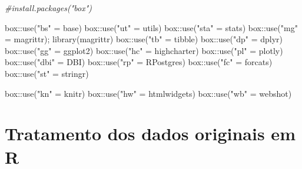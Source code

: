 \documentclass[
]{article}
\newenvironment{Shaded}{\begin{snugshade}}{\end{snugshade}}
\newcommand{\CommentTok}[1]{\textcolor[rgb]{0.56,0.35,0.01}{\textit{#1}}}
\newcommand{\FunctionTok}[1]{\textcolor[rgb]{0.00,0.00,0.00}{#1}}
\newcommand{\NormalTok}[1]{#1}
\newcommand{\OtherTok}[1]{\textcolor[rgb]{0.56,0.35,0.01}{#1}}
\newcommand{\SpecialCharTok}[1]{\textcolor[rgb]{0.00,0.00,0.00}{#1}}
\newcommand{\StringTok}[1]{\textcolor[rgb]{0.31,0.60,0.02}{#1}}
\begin{document}
\begin{Shaded}
\begin{Highlighting}[]
\CommentTok{\#install.packages("box")}

\NormalTok{box}\SpecialCharTok{::}\FunctionTok{use}\NormalTok{(}\StringTok{"bs"} \OtherTok{=}\NormalTok{ base)}
\NormalTok{box}\SpecialCharTok{::}\FunctionTok{use}\NormalTok{(}\StringTok{"ut"} \OtherTok{=}\NormalTok{ utils)}
\NormalTok{box}\SpecialCharTok{::}\FunctionTok{use}\NormalTok{(}\StringTok{"sta"} \OtherTok{=}\NormalTok{ stats)}
\NormalTok{box}\SpecialCharTok{::}\FunctionTok{use}\NormalTok{(}\StringTok{"mg"} \OtherTok{=}\NormalTok{ magrittr); }\FunctionTok{library}\NormalTok{(magrittr)}
\NormalTok{box}\SpecialCharTok{::}\FunctionTok{use}\NormalTok{(}\StringTok{"tb"} \OtherTok{=}\NormalTok{ tibble)}
\NormalTok{box}\SpecialCharTok{::}\FunctionTok{use}\NormalTok{(}\StringTok{"dp"} \OtherTok{=}\NormalTok{ dplyr)}
\NormalTok{box}\SpecialCharTok{::}\FunctionTok{use}\NormalTok{(}\StringTok{"gg"} \OtherTok{=}\NormalTok{ ggplot2)}
\NormalTok{box}\SpecialCharTok{::}\FunctionTok{use}\NormalTok{(}\StringTok{"hc"} \OtherTok{=}\NormalTok{ highcharter)}
\NormalTok{box}\SpecialCharTok{::}\FunctionTok{use}\NormalTok{(}\StringTok{"pl"} \OtherTok{=}\NormalTok{ plotly)}
\NormalTok{box}\SpecialCharTok{::}\FunctionTok{use}\NormalTok{(}\StringTok{"dbi"} \OtherTok{=}\NormalTok{ DBI)}
\NormalTok{box}\SpecialCharTok{::}\FunctionTok{use}\NormalTok{(}\StringTok{"rp"} \OtherTok{=}\NormalTok{ RPostgres)}
\NormalTok{box}\SpecialCharTok{::}\FunctionTok{use}\NormalTok{(}\StringTok{"fc"} \OtherTok{=}\NormalTok{ forcats)}
\NormalTok{box}\SpecialCharTok{::}\FunctionTok{use}\NormalTok{(}\StringTok{"st"} \OtherTok{=}\NormalTok{ stringr)}

\NormalTok{box}\SpecialCharTok{::}\FunctionTok{use}\NormalTok{(}\StringTok{"kn"} \OtherTok{=}\NormalTok{ knitr)}
\NormalTok{box}\SpecialCharTok{::}\FunctionTok{use}\NormalTok{(}\StringTok{"hw"} \OtherTok{=}\NormalTok{ htmlwidgets)}
\NormalTok{box}\SpecialCharTok{::}\FunctionTok{use}\NormalTok{(}\StringTok{"wb"} \OtherTok{=}\NormalTok{ webshot)}
\end{Highlighting}
\end{Shaded}

\hypertarget{tratamento-dos-dados-originais-em-r}{%
\section{Tratamento dos dados originais em
R}\label{tratamento-dos-dados-originais-em-r}}
\end{document}
